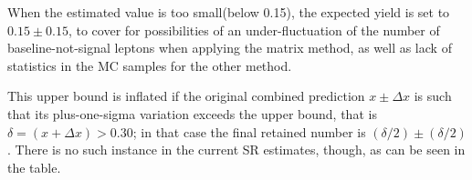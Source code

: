 When the estimated value is too small(below 0.15), the expected yield is set to $0.15\pm 0.15$, 
to cover for possibilities of an under-fluctuation of the number of baseline-not-signal leptons 
when applying the matrix method, as well as lack of statistics in the MC samples for the other method. 
 
This upper bound is inflated if the original combined prediction $x\pm\Delta x$ 
is such that its plus-one-sigma variation exceeds the upper bound, that is $\delta=(x+\Delta x)>0.30$; 
in that case the final retained number is $(\delta/2)\pm (\delta/2)$. 
There is no such instance in the current SR estimates, though, as can be seen in the table.  

\begin{table}[!htb]
\caption{Expected yields for background processes with fake leptons,
in the signal regions proposed in Section~\ref{sec:signalregions}, shown for 36 \ifb. 
Uncertainties include all statistical and systematic sources for the nominal estimate (except ABCD, cf section~\ref{subsec:fakes_abcd}). 
}
\label{tab:fakes_sr_yields}
\centering
{}
\end{table}
